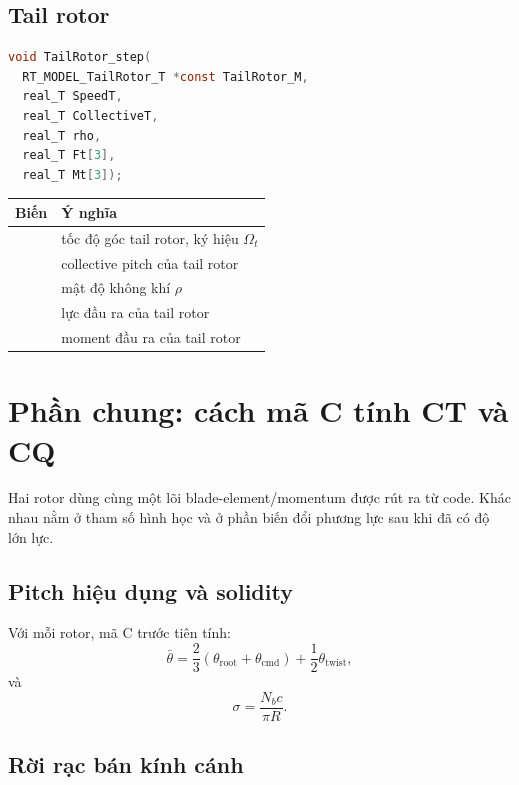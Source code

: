\documentclass[11pt,a4paper]{article}
\newcommand{\code}[1]{\texttt{\detokenize{#1}}}
\begin{document}
\subsection{Tail rotor}

\begin{lstlisting}[language=C]
void TailRotor_step(
  RT_MODEL_TailRotor_T *const TailRotor_M,
  real_T SpeedT,
  real_T CollectiveT,
  real_T rho,
  real_T Ft[3],
  real_T Mt[3]);
\end{lstlisting}

\begin{center}
\begin{tabular}{@{}ll@{}}
\toprule
Biến & Ý nghĩa \\
\midrule
\code{SpeedT} & tốc độ góc tail rotor, ký hiệu \(\Omega_t\) \\
\code{CollectiveT} & collective pitch của tail rotor \\
\code{rho} & mật độ không khí \(\rho\) \\
\code{Ft[3]} & lực đầu ra của tail rotor \\
\code{Mt[3]} & moment đầu ra của tail rotor \\
\bottomrule
\end{tabular}
\end{center}

\section{Phần chung: cách mã C tính CT và CQ}

Hai rotor dùng cùng một lõi blade-element/momentum được rút ra từ code.
Khác nhau nằm ở tham số hình học và ở phần biến đổi phương lực sau khi đã có độ lớn lực.

\subsection{Pitch hiệu dụng và solidity}

Với mỗi rotor, mã C trước tiên tính:
\begin{equation}
  \bar{\theta}
  = \frac{2}{3}\left(\theta_{\mathrm{root}} + \theta_{\mathrm{cmd}}\right)
    + \frac{1}{2}\theta_{\mathrm{twist}},
\end{equation}
và
\begin{equation}
  \sigma = \frac{N_b c}{\pi R}.
\end{equation}

\subsection{Rời rạc bán kính cánh}
\end{document}
